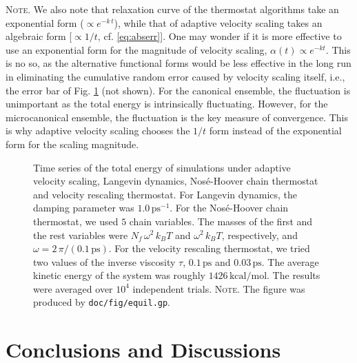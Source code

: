 \documentclass[reprint]{revtex4-1}
\newcommand{\red}[1]{{\color{red} #1}}
\newcommand{\note}[1]{{\color{DarkGreen}\footnotesize \textsc{Note.} #1}}
\begin{document}
\note{
We also note that relaxation curve of the thermostat algorithms
take an exponential form ($\propto e^{-k\,t}$),
while that of adaptive velocity scaling takes
an algebraic form [$\propto 1/t$,
cf. \eqref{eq:abserr}].
%
One may wonder if it is more effective to use an exponential form
for the magnitude of velocity scaling,
$\alpha(t) \propto e^{-kt}$.
%
This is no so, as the alternative functional forms
would be less effective in the long run
in eliminating the cumulative random error
caused by velocity scaling itself,
i.e., the error bar of Fig. \ref{fig:equil} (not shown).
%
For the canonical ensemble, the fluctuation is unimportant
as the total energy is intrinsically fluctuating.
%
However, for the microcanonical ensemble, the fluctuation
is the key measure of convergence.
%
This is why adaptive velocity scaling chooses the $1/t$ form
instead of the exponential form for the scaling magnitude.
}

\begin{figure}[h]
\begin{center}
  \caption{
    \label{fig:equil}
    Time series of the total energy
    of simulations under
    adaptive velocity scaling,
    Langevin dynamics,
    Nos\'e-Hoover chain thermostat
    and
    velocity rescaling thermostat.
    For Langevin dynamics,
    the damping parameter was $1.0 \, \mathrm{ps}^{-1}$.
    For the Nos\'e-Hoover chain thermostat,
    we used $5$ chain variables. The masses
    of the first and the rest variables
    were $N_f \, \omega^2 \, k_B T$ and
    $\omega^2 \, k_B T$, respectively\cite{martyna1992},
    and
    $\omega = 2 \,\pi/(0.1 \, \mathrm{ps})$.
    For the velocity rescaling thermostat,
    we tried two values of the inverse viscosity $\tau$,
    $0.1 \, \mathrm{ps}$ and $0.03 \, \mathrm{ps}$.
    The average kinetic energy of the system
    was roughly $1426 \, \mathrm{kcal/mol}$.
    The results were averaged over $10^4$ independent trials.
    \note{The figure was produced by \texttt{doc/fig/equil.gp}.
    }%
  }
\end{center}
\end{figure}






\section{\label{sec:conclusion}
Conclusions and Discussions}
\end{document}
